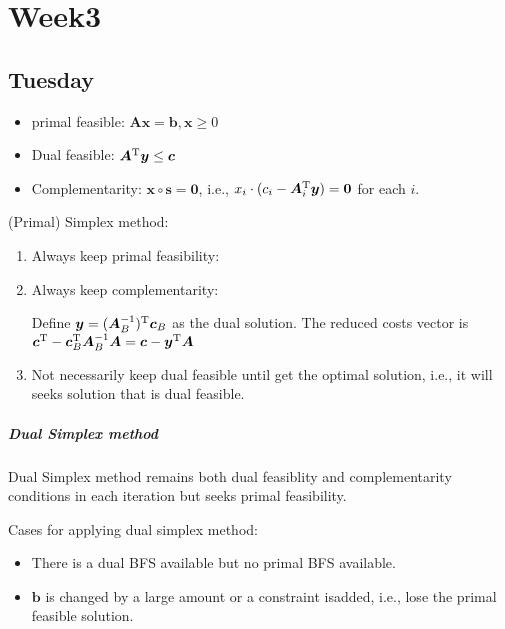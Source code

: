 
\chapter{Week3}

\section{Tuesday}
\begin{theorem}
\begin{itemize}
\item
primal feasible: $\bm{Ax}=\bm b,\bm x\ge0$
\item
Dual feasible: $\bm{A}^{\mathrm T}\bm y\le\bm c$
\item
Complementarity: $\bm x\circ \bm s=\bm0$, i.e., $x_i\cdot (c_i-\bm A_i^{\mathrm T}\bm y)=\bm0$ for each $i$.
\end{itemize}
\end{theorem}
\begin{remark}
(Primal) Simplex method:
\begin{enumerate}
\item
Always keep primal feasibility:
\item
Always keep complementarity:

Define $\bm y=(\bm A_B^{-1})^{\mathrm T}\bm c_B$ as the dual solution. The reduced costs vector is $\bm c^{\mathrm T}-\bm c_B^{\mathrm T}\bm A_B^{-1}\bm A=\bm c-\bm y^{\mathrm T}\bm A$
\item
Not necessarily keep dual feasible until get the optimal solution, i.e., it will seeks solution that is dual feasible.
\end{enumerate}
\end{remark}
\paragraph{Dual Simplex method}
Dual Simplex method remains both dual feasiblity and complementarity conditions in each iteration but seeks primal feasibility.

Cases for applying dual simplex method:
\begin{itemize}
\item
There is a dual BFS available but no primal BFS available.
\item
$\bm b$ is changed by a large amount or a constraint isadded, i.e., lose the primal feasible solution.
\end{itemize}

